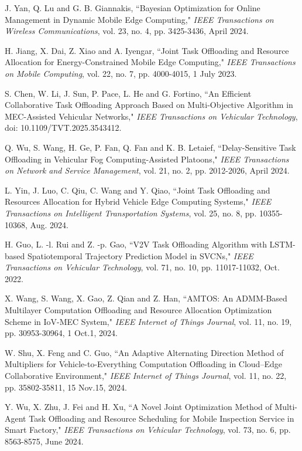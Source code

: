 \documentclass[lettersize,journal]{IEEEtran}
\begin{document}
\begin{thebibliography}{10}
J. Yan, Q. Lu and G. B. Giannakis, ``Bayesian Optimization for Online Management in Dynamic Mobile Edge Computing," \textit{IEEE Transactions on Wireless Communications}, vol. 23, no. 4, pp. 3425-3436, April 2024.


H. Jiang, X. Dai, Z. Xiao and A. Iyengar, ``Joint Task Offloading and Resource Allocation for Energy-Constrained Mobile Edge Computing," \textit{IEEE Transactions on Mobile Computing}, vol. 22, no. 7, pp. 4000-4015, 1 July 2023.

S. Chen, W. Li, J. Sun, P. Pace, L. He and G. Fortino, ``An Efficient Collaborative Task Offloading Approach Based on Multi-Objective Algorithm in MEC-Assisted Vehicular Networks," \textit{IEEE Transactions on Vehicular Technology}, doi: 10.1109/TVT.2025.3543412.

Q. Wu, S. Wang, H. Ge, P. Fan, Q. Fan and K. B. Letaief, ``Delay-Sensitive Task Offloading in Vehicular Fog Computing-Assisted Platoons," \textit{IEEE Transactions on Network and Service Management}, vol. 21, no. 2, pp. 2012-2026, April 2024.

L. Yin, J. Luo, C. Qiu, C. Wang and Y. Qiao, ``Joint Task Offloading and Resources Allocation for Hybrid Vehicle Edge Computing Systems," \textit{IEEE Transactions on Intelligent Transportation Systems}, vol. 25, no. 8, pp. 10355-10368, Aug. 2024.

H. Guo, L. -l. Rui and Z. -p. Gao, ``V2V Task Offloading Algorithm with LSTM-based Spatiotemporal Trajectory Prediction Model in SVCNs," \textit{IEEE Transactions on Vehicular Technology}, vol. 71, no. 10, pp. 11017-11032, Oct. 2022.

X. Wang, S. Wang, X. Gao, Z. Qian and Z. Han, ``AMTOS: An ADMM-Based Multilayer Computation Offloading and Resource Allocation Optimization Scheme in IoV-MEC System," \textit{IEEE Internet of Things Journal}, vol. 11, no. 19, pp. 30953-30964, 1 Oct.1, 2024.

W. Shu, X. Feng and C. Guo, ``An Adaptive Alternating Direction Method of Multipliers for Vehicle-to-Everything Computation Offloading in Cloud–Edge Collaborative Environment," \textit{IEEE Internet of Things Journal}, vol. 11, no. 22, pp. 35802-35811, 15 Nov.15, 2024.

Y. Wu, X. Zhu, J. Fei and H. Xu, ``A Novel Joint Optimization Method of Multi-Agent Task Offloading and Resource Scheduling for Mobile Inspection Service in Smart Factory," \textit{IEEE Transactions on Vehicular Technology}, vol. 73, no. 6, pp. 8563-8575, June 2024.


\end{thebibliography}
\end{document}
